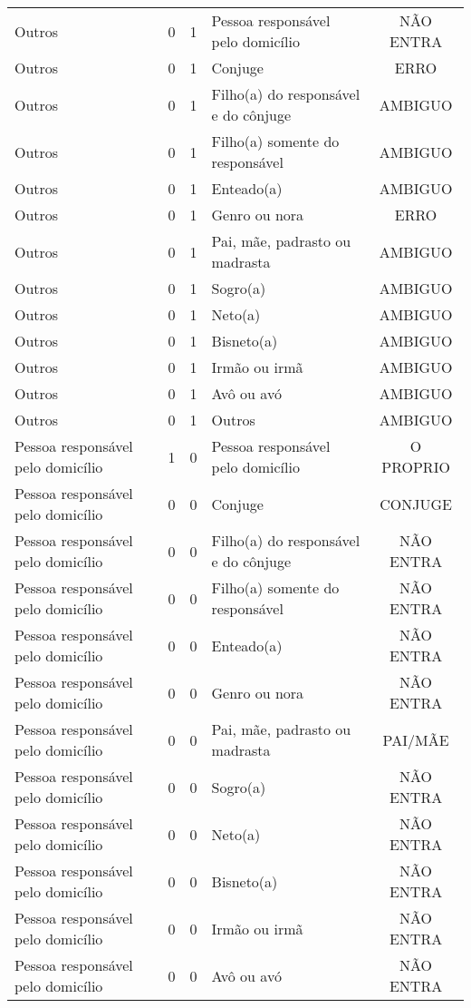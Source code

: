 \documentclass[
	12pt,				%
	openright,			%
	twoside,			%
	a4paper,			%
	english,			%
	french,				%
	spanish,			%
	brazil				%
	]{abntex2}
\begin{document}
\begin{anexosenv}
\begin{longtable}{@{}lcclc@{}}
				Outros & 0 & 1 & Pessoa responsável pelo domicílio & NÃO ENTRA \\
				Outros & 0 & 1 & Conjuge & ERRO \\
				Outros & 0 & 1 & Filho(a) do responsável e do cônjuge & AMBIGUO \\
				Outros & 0 & 1 & Filho(a) somente do responsável & AMBIGUO \\
				Outros & 0 & 1 & Enteado(a) & AMBIGUO \\
				Outros & 0 & 1 & Genro ou nora & ERRO \\
				Outros & 0 & 1 & Pai, mãe, padrasto ou madrasta & AMBIGUO \\
				Outros & 0 & 1 & Sogro(a) & AMBIGUO \\
				Outros & 0 & 1 & Neto(a) & AMBIGUO \\
				Outros & 0 & 1 & Bisneto(a) & AMBIGUO \\
				Outros & 0 & 1 & Irmão ou irmã & AMBIGUO \\
				Outros & 0 & 1 & Avô ou avó & AMBIGUO \\
				Outros & 0 & 1 & Outros & AMBIGUO \\
				Pessoa responsável pelo domicílio & 1 & 0 & Pessoa responsável pelo domicílio & O PROPRIO \\
				Pessoa responsável pelo domicílio & 0 & 0 & Conjuge & CONJUGE \\
				Pessoa responsável pelo domicílio & 0 & 0 & Filho(a) do responsável e do cônjuge & NÃO ENTRA \\
				Pessoa responsável pelo domicílio & 0 & 0 & Filho(a) somente do responsável & NÃO ENTRA \\
				Pessoa responsável pelo domicílio & 0 & 0 & Enteado(a) & NÃO ENTRA \\
				Pessoa responsável pelo domicílio & 0 & 0 & Genro ou nora & NÃO ENTRA \\
				Pessoa responsável pelo domicílio & 0 & 0 & Pai, mãe, padrasto ou madrasta & PAI/MÃE \\
				Pessoa responsável pelo domicílio & 0 & 0 & Sogro(a) & NÃO ENTRA \\
				Pessoa responsável pelo domicílio & 0 & 0 & Neto(a) & NÃO ENTRA \\
				Pessoa responsável pelo domicílio & 0 & 0 & Bisneto(a) & NÃO ENTRA \\
				Pessoa responsável pelo domicílio & 0 & 0 & Irmão ou irmã & NÃO ENTRA \\
				Pessoa responsável pelo domicílio & 0 & 0 & Avô ou avó & NÃO ENTRA \\

\end{longtable}
\end{anexosenv}
\end{document}
